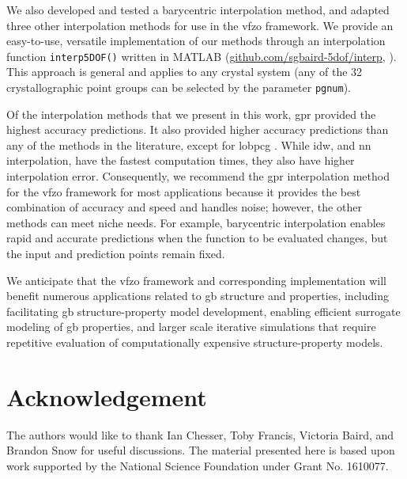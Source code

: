 \documentclass[final,twocolumn,12pt]{elsarticle}
\newcommand{\inpt}{input}
\newcommand{\outpt}{prediction}
\begin{document}
We also developed and tested a barycentric interpolation method, and adapted three other interpolation methods for use in the \gls{vfzo} framework. We provide an easy-to-use, versatile implementation of our methods through an interpolation function \texttt{interp5DOF()} written in MATLAB  (\url{github.com/sgbaird-5dof/interp}, \cite{bairdFiveDegreeofFreedom5DOF2020}).  This approach is general and applies to any crystal system (any of the 32 crystallographic point groups can be selected by the parameter \texttt{pgnum}). 

Of the interpolation methods that we present in this work, \Gls{gpr} provided the highest accuracy predictions. It also provided higher accuracy predictions than any of the methods in the literature, except for \gls{lobpcg} \cite{shenDeterminingGrainBoundary2019}. While \gls{idw}, and \gls{nn} interpolation, have the fastest computation times, they also have higher interpolation error. Consequently, we recommend the \gls{gpr} interpolation method for the \gls{vfzo} framework for most applications because it provides the best combination of accuracy and speed and handles noise; however, the other methods can meet niche needs. For example, barycentric interpolation enables rapid and accurate predictions when the function to be evaluated changes, but the \inpt{} and \outpt{} points remain fixed. 

We anticipate that the \gls{vfzo} framework and corresponding implementation will benefit numerous applications related to \gls{gb} structure and properties, including facilitating \gls{gb} structure-property model development, enabling efficient surrogate modeling of \gls{gb} properties, and larger scale iterative simulations that require repetitive evaluation of computationally expensive structure-property models.

\section*{Acknowledgement}
\label{sec:acknowledgement}

The authors would like to thank Ian Chesser, Toby Francis, Victoria Baird, and Brandon Snow for useful discussions. The material presented here is based upon work supported by the National Science Foundation under Grant No. 1610077.

% 
\end{document}
